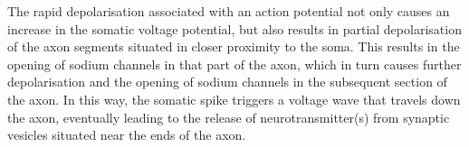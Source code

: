 \noindent The rapid depolarisation associated with an action potential not only causes an increase in the somatic voltage potential, but also results in partial depolarisation of the axon segments situated in closer proximity to the soma. This results in the opening of sodium channels in that part of the axon, which in turn causes further depolarisation and the opening of sodium channels in the subsequent section of the axon. In this way, the somatic spike triggers a voltage wave that travels down the axon, eventually leading to the release of neurotransmitter(s) from synaptic vesicles situated near the ends of the axon. \\





